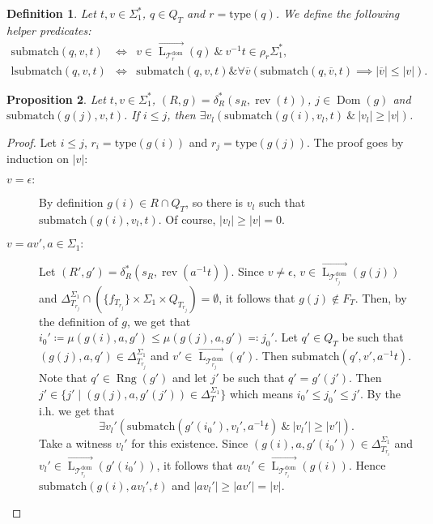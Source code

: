 \documentclass{article}
\newtheorem{definition}{Definition}[section]
\newtheorem{proposition}[definition]{Proposition}
\newcommand{\len}[1]{\ensuremath{\left| #1 \right|}}
\DeclareMathOperator{\Dom}{Dom}
\DeclareMathOperator{\Rng}{Rng}
\DeclareMathOperator{\Lang}{L}
\DeclareMathOperator{\rev}{rev}
\begin{document}
	\begin{definition} \label{def:submatch}
		Let $t, v\in \Sigma_1^*$, $q\in Q_T$ and $r = \mathrm{type}(q)$. We define the following helper predicates:
		\begin{eqnarray*}
			\mathrm{submatch}(q, v, t) & \iff & v\in\overrightarrow{\Lang_{\mathcal{T}_r^\mathrm{dom}}}(q)\ \& \ v^{-1}t\in \rho_r\Sigma_1^*, \\
			\mathrm{lsubmatch}(q, v, t) & \iff & \mathrm{submatch}(q, v, t) \mathbin\& \forall \overline{v}(\mathrm{submatch}(q, \overline{v}, t) \implies \len{\overline{v}} \le \len{v}).
		\end{eqnarray*}
	\end{definition}

	\begin{proposition} \label{prop:g-ordering_len}
		Let $t, v \in \Sigma_1^*$, $(R, g) = \delta_R^*(s_R, \rev(t))$, $j\in \Dom(g)$ and $\mathrm{submatch}(g(j), v, t)$.
		If $i\le j$, then \( \exists v_l(\mathrm{submatch}(g(i), v_l, t)\ \&\ \len{v_l} \ge \len{v}) \).
	\end{proposition}
	\begin{proof}
		Let $i\le j$, $r_i = \mathrm{type}(g(i))$ and $r_j = \mathrm{type}(g(j))$. The proof goes by induction on \len{v}:
		\begin{description}
			\item[$v=\epsilon:$]
				By definition $g(i)\in R \cap Q_T$, so there is $v_l$ such that $\mathrm{submatch}(g(i), v_l, t)$. Of course, $\len{v_l}\ge\len{v}=0$.
			\item[$v=av', a\in \Sigma_1:$]
				Let $(R', g') = \delta_R^*(s_R, \rev(a^{-1}t))$.
				Since $v\ne\epsilon$, $v\in\overrightarrow{\Lang_{\mathcal{T}_{r_j}^\mathrm{dom}}}(g(j))$ and
				$\Delta_{T_{r_j}}^{\Sigma_1} \cap (\{ f_{T_{r_j}} \} \times \Sigma_1 \times Q_{T_{r_j}}) = \emptyset$, it follows that
				$g(j)\notin F_T$. Then, by the definition of $g$, we get that $i_0'\coloneq\mu(g(i), a, g')\le \mu(g(j), a, g')\eqcolon j_0'$. Let $q'\in Q_T$ be such that $(g(j), a, q')\in \Delta_{T_{r_j}}^{\Sigma_1}$ and $v'\in \overrightarrow{\Lang_{\mathcal{T}_{r_j}^\mathrm{dom}}}(q')$. Then $\mathrm{submatch}(q', v', a^{-1}t)$. Note that $q'\in\Rng(g')$ and let $j'$ be such that $q' = g'(j')$. Then $j'\in \{ j' \mid (g(j), a, g'(j'))\in \Delta_T^{\Sigma_1} \}$ which means $i_0'\le j_0'\le j'$.
				By the i.h. we get that
				\[ \exists v_l'(\mathrm{submatch}(g'(i_0'), v_l', a^{-1}t)\ \&\ \len{v_l'} \ge \len{v'}). \]
				Take a witness $v_l'$ for this existence.
				Since $(g(i), a, g'(i_0'))\in \Delta_{T_{r_i}}^{\Sigma_1}$
				and $v_l'\in \overrightarrow{\Lang_{\mathcal{T}_{r_i}^\mathrm{dom}}}(g'(i_0'))$,
				it follows that $av_l'\in \overrightarrow{\Lang_{\mathcal{T}_{r_i}^\mathrm{dom}}}(g(i))$.
				Hence $\mathrm{submatch}(g(i), av_l', t)$ and $\len{av_l'}\ge \len{av'} = \len{v}$.
		\end{description}
	\end{proof}
\end{document}
